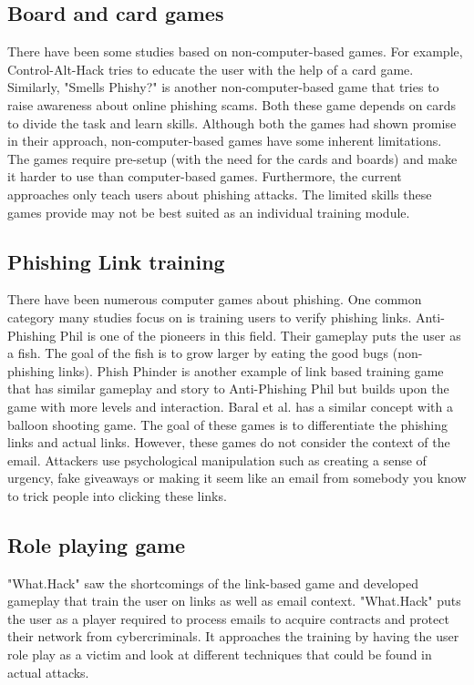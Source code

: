 \subsection{Board and card games}
There have been some studies based on non-computer-based games. For example, Control-Alt-Hack \cite{control_alt_hack} tries to educate the user with the help of a card game. Similarly, "Smells Phishy?" is another non-computer-based game that tries to raise awareness about online phishing scams. Both these game depends on cards to divide the task and learn skills. Although both the games had shown promise in their approach, non-computer-based games have some inherent limitations. The games require pre-setup (with the need for the cards and boards) and make it harder to use than computer-based games. Furthermore, the current approaches only teach users about phishing attacks. The limited skills these games provide may not be best suited as an individual training module.

\subsection{Phishing Link training}
There have been numerous computer games about phishing. One common category many studies focus on is training users to verify phishing links. Anti-Phishing Phil \cite{anti_phishing_phil} is one of the pioneers in this field. Their gameplay puts the user as a fish. The goal of the fish is to grow larger by eating the good bugs (non-phishing links). Phish Phinder \cite{phish_phinder} is another example of link based training game that has similar gameplay and story to Anti-Phishing Phil but builds upon the game with more levels and interaction. Baral et al. \cite{gamified_appraoch} has a similar concept with a balloon shooting game. The goal of these games is to differentiate the phishing links and actual links. However, these games do not consider the context of the email. Attackers use psychological manipulation such as creating a sense of urgency, fake giveaways or making it seem like an email from somebody you know to trick people into clicking these links.

\subsection{Role playing game}
"What.Hack" \cite{what_hack} saw the shortcomings of the link-based game and developed gameplay that train the user on links as well as email context. "What.Hack" puts the user as a player required to process emails to acquire contracts and protect their network from cybercriminals. It approaches the training by having the user role play as a victim and look at different techniques that could be found in actual attacks.

